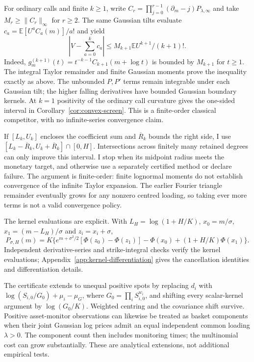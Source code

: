 \documentclass[11pt]{article}
\newcommand{\E}{\mathbb E}
\begin{document}
For ordinary calls and finite $k\geq1$, write $C_r=\prod_{j=0}^{r-1}(\partial_m-j)P_{\lambda,\infty}$ and take $M_r\geq\|C_r\|_\infty$ for $r\geq2$. The same Gaussian tilts evaluate
$c_a=\E[U^aC_a(m)]/a!$ and yield
\begin{equation}
 \left|V-\sum_{a=0}^kc_a\right|
 \leq M_{k+1}\E U^{k+1}/(k+1)!.
\end{equation}
Indeed, $g_m^{(k+1)}(t)=t^{-k-1}C_{k+1}(m+\log t)$ is bounded by
$M_{k+1}$ for $t\geq1$. The integral Taylor remainder and finite Gaussian
moments prove the inequality exactly as above. The unbounded $P,P'$ terms
remain integrable under each Gaussian tilt; the higher falling derivatives
have bounded Gaussian boundary kernels. At $k=1$ positivity of the ordinary
call curvature gives the one-sided interval in
Corollary~\ref{cor:convex-screen}. This is a finite-order classical
competitor, with no infinite-series convergence claim.

If $[L_k,U_k]$ encloses the coefficient sum and $\overline R_k$ bounds the
right side, I use
$[L_k-\overline R_k,U_k+\overline R_k]\cap[0,H]$.
Intersections across finitely many retained degrees can only improve this
interval.  I stop when its midpoint radius meets the monetary target,
and otherwise use a separately certified method or declare failure.
The argument is finite-order: finite lognormal moments do not establish
convergence of the infinite Taylor expansion.  The earlier Fourier
triangle remainder eventually grows for any nonzero centred loading,
so taking ever more terms is not a valid convergence policy.

The kernel evaluations are explicit.  With $L_H=\log(1+H/K)$,
$x_0=m/\sigma$, $x_1=(m-L_H)/\sigma$ and $z_i=x_i+\sigma$,
\begin{equation}
 P_{\sigma,H}(m)=K\{e^{m+\sigma^2/2}[\Phi(z_0)-\Phi(z_1)]
                   -\Phi(x_0)+(1+H/K)\Phi(x_1)\}.
 \label{eq:closed-kernel}
\end{equation}
Independent derivative-series and strike-integral checks verify the kernel evaluations; Appendix~\ref{app:kernel-differentiation} gives the cancellation identities and differentiation details.

The certificate extends to unequal positive spots by replacing $d_i$ with
$\log(S_{i,0}/G_0)+\mu_i-\mu_G$, where
$G_0=\prod_iS_{i,0}^{w_i}$, and shifting every scalar-kernel argument by
$\log(G_0/K)$.  Weighted centring and the covariance shift survive.
Positive asset-monitor observations can likewise be treated as basket
components when their joint Gaussian log prices admit an equal independent
common loading $\lambda>0$.  The component count then includes monitoring
times; the multinomial cost can grow substantially.  These are analytical
extensions, not additional empirical tests.
\end{document}
